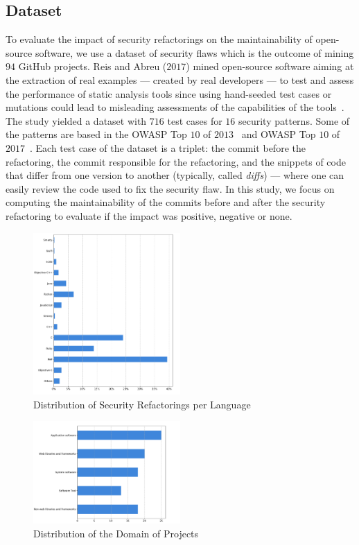 \documentclass[10pt,conference]{IEEEtran}
\begin{document}
\subsection{Dataset}
%
To evaluate the impact of security refactorings on the maintainability of
open-source software, we use a dataset of security flaws which is the outcome of
mining $94$ GitHub projects. Reis and Abreu ($2017$) mined open-source
software aiming at the extraction of real examples --- created by real
developers --- to test and assess the performance of static analysis tools since
using hand-seeded test cases or mutations could lead to misleading assessments
of the capabilities of the tools~\cite{just2014mutants}. The study yielded a
dataset with $716$ test cases for $16$ security patterns. Some of the patterns
are based in the OWASP Top $10$ of $2013$~\cite{oswap:2013} and OWASP Top $10$ of
$2017$~\cite{oswap:2017}. Each test case of the
dataset is a triplet: the commit before the refactoring, the commit responsible
for the refactoring, and the snippets of code that differ from one version to
another (typically, called \textit{diffs}) --- where one can easily review the
code used to fix the security flaw. In this study, we focus on computing the
maintainability of the commits before and after the security refactoring to
evaluate if the impact was positive, negative or none.

\begin{figure}[h]
 	\centering 	\includegraphics[width=0.5\textwidth]{figures/language_dist.pdf}
 	\caption{Distribution of Security Refactorings per Language}
	\label{fig:lang}
\end{figure}

\begin{figure}[h]
 	\centering 	\includegraphics[width=0.5\textwidth]{figures/type_dist.pdf}
 	\caption{Distribution of the Domain of Projects}
	\label{fig:domain}
\end{figure}
\end{document}
